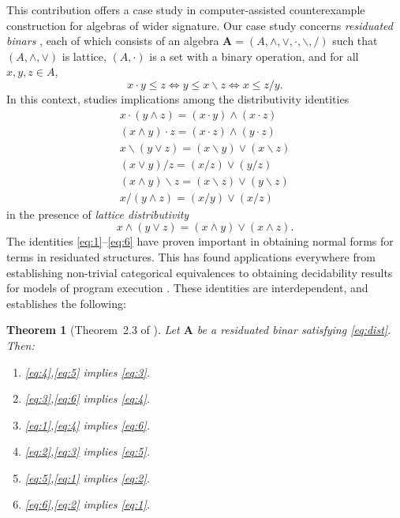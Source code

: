 \documentclass{easychair}
\newtheorem{theorem}{Theorem}
\begin{document}
This contribution offers a case study in computer-assisted counterexample construction for algebras of wider signature. Our case study concerns \emph{residuated binars} \cite{FJ2019}, each of which consists of an algebra ${\mathbf A} = (A,\wedge,\vee,\cdot,\backslash,\slash)$ such that $(A,\wedge,\vee)$ is lattice, $(A,\cdot)$ is a set with a binary operation, and for all $x,y,z\in A$,
\begin{equation}\label{eq:resid}
x\cdot y\leq z \iff y\leq x\backslash z \iff x\leq z\slash y.
\end{equation}
In this context, \cite{FJ2019} studies implications among the distributivity identities
\begin{align}
x\cdot(y\wedge z)= (x\cdot y)\wedge(x\cdot z) \label{eq:1} \\
(x\wedge y)\cdot z= (x\cdot z)\wedge (y\cdot z) \label{eq:2} \\
x\backslash (y\vee z) = (x\backslash y)\vee(x\backslash z ) \label{eq:3} \\
(x\vee y)\slash z = (x\slash z)\vee(y\slash z) \label{eq:4} \\
(x\wedge y)\backslash z = (x\backslash z)\vee(y\backslash z) \label{eq:5} \\
x\slash (y\wedge z) = (x\slash y)\vee(x\slash z) \label{eq:6}
\end{align}
in the presence of \emph{lattice distributivity}
  \begin{equation} \label{eq:dist}
    x\wedge (y\vee z)= (x\wedge y)\vee (x\wedge z).
    \end{equation}
The identities \eqref{eq:1}--\eqref{eq:6} have proven important in obtaining normal forms for terms in residuated structures. This has found applications everywhere from establishing non-trivial categorical equivalences \cite{GR2012} to obtaining decidability results for models of program execution \cite{GGMS2021}. These identities are interdependent, and \cite{FJ2019} establishes the following:
\begin{theorem}[Theorem~2.3 of \cite{FJ2019}]\label{old_theorem}
Let ${\mathbf A}$ be a residuated binar satisfying \eqref{eq:dist}. Then:
\begin{multicols}{2}
\begin{enumerate}
\itemsep0em 
\item \eqref{eq:4},\eqref{eq:5} implies \eqref{eq:3}.
\item \eqref{eq:3},\eqref{eq:6} implies \eqref{eq:4}.
\item \eqref{eq:1},\eqref{eq:4} implies \eqref{eq:6}.
\item \eqref{eq:2},\eqref{eq:3} implies \eqref{eq:5}.
\item \eqref{eq:5},\eqref{eq:1} implies \eqref{eq:2}.
\item \eqref{eq:6},\eqref{eq:2} implies \eqref{eq:1}.
\end{enumerate}
\end{multicols}
\end{theorem}
\end{document}
